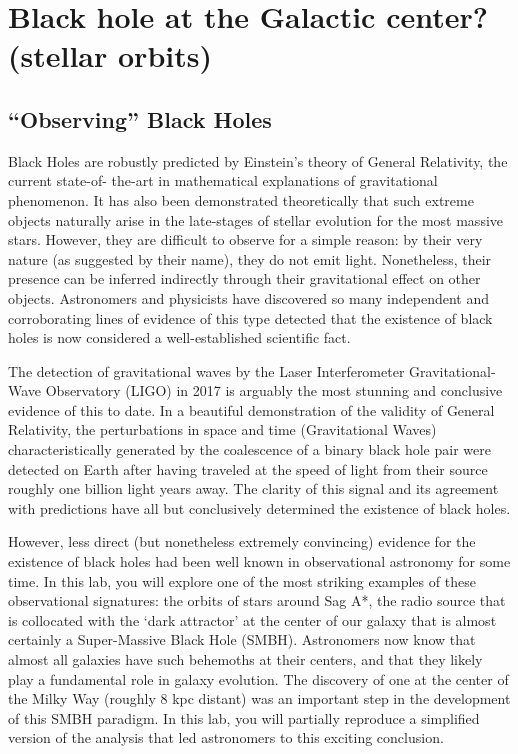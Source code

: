 \chapter{Black hole at the Galactic center? (stellar orbits)}


\section{``Observing'' Black Holes}

Black Holes are robustly predicted by Einstein's theory of General Relativity, the current state-of-
the-art in mathematical explanations of gravitational phenomenon. It has also been demonstrated
theoretically that such extreme objects naturally arise in the late-stages of stellar evolution for the
most massive stars. However, they are difficult to observe for a simple reason: by their very nature (as
suggested by their name), they do not emit light. Nonetheless, their presence can be inferred indirectly
through their gravitational effect on other objects. Astronomers and physicists have discovered so many
independent and corroborating lines of evidence of this type detected that the existence of black holes
is now considered a well-established scientific fact.

The detection of gravitational waves by the Laser Interferometer Gravitational-Wave Observatory
(LIGO) in 2017 is arguably the most stunning and conclusive evidence of this to date. In a
beautiful demonstration of the validity of General Relativity, the perturbations in space and time
(Gravitational Waves) characteristically generated by the coalescence of a binary black hole pair were
detected on Earth after having traveled at the speed of light from their source roughly one billion light
years away. The clarity of this signal and its agreement with predictions have all but conclusively
determined the existence of black holes.

However, less direct (but nonetheless extremely convincing) evidence for the existence of black holes
had been well known in observational astronomy for some time. In this lab, you will explore one of the
most striking examples of these observational signatures: the orbits of stars around Sag A*, the radio source that is collocated with the `dark attractor' at the center of our galaxy that is almost certainly a Super-Massive Black Hole (SMBH). Astronomers now know that almost all galaxies have such behemoths at their centers, and that they likely play a fundamental role in galaxy evolution. The discovery of one at the center of the Milky Way (roughly 8 kpc distant) was an important step in the development of this SMBH paradigm. In this lab, you will partially reproduce a simplified version of the analysis that led astronomers to this exciting conclusion.

